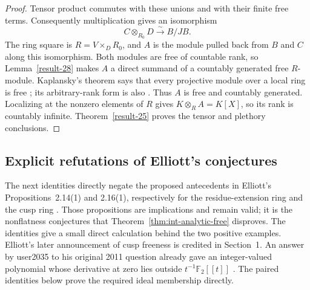 \documentclass[11pt,a4paper]{article}
\theoremstyle{definition}
\begin{document}
\begin{proof}
Tensor product commutes with these unions and with their finite
free terms. Consequently multiplication gives an isomorphism
\[
 C\otimes_{R_0}D\xrightarrow{\sim}B/JB.
\]
The ring square is $R=V\times_D R_0$, and $A$ is the module
pulled back from $B$ and $C$ along this isomorphism. Both modules
are free of countable rank, so Lemma~\ref{result-28} makes $A$
a direct summand of a countably generated free $R$-module.
Kaplansky's theorem says that every projective module over a local
ring is free \cite[Theorem~2]{Kaplansky1958}; its arbitrary-rank
form is also \cite[Theorem~10.85.4, tag 0593]{StacksProjectiveLocal}.
Thus $A$ is free and countably generated. Localizing at the
nonzero elements of $R$ gives $K\otimes_R A=K[X]$, so its
rank is countably infinite. Theorem~\ref{result-25} proves the
tensor and plethory conclusions.
\end{proof}



\subsection{Explicit refutations of Elliott's conjectures}
The next identities directly negate the proposed antecedents in
Elliott's Propositions~2.14(1) and 2.16(1), respectively for the
residue-extension ring and the cusp ring
\cite[author version p.~12]{Elliott2011IntegerTClosure}.
Those propositions are implications and remain valid; it is the
nonflatness conjectures that Theorem~\ref{thm:int-analytic-free}
disproves. The identities give a small direct calculation behind
the two positive examples. Elliott's later announcement of cusp
freeness is credited in Section~1. An answer by user2035 to his
original 2011 question already gave an integer-valued polynomial
whose derivative at zero lies outside $t^{-1}\mathbb F_2[[t]]$
\cite[answer of 12 September 2011]{Elliott2013CuspAnnouncement}.
The paired identities below prove the required ideal membership
directly.


\end{document}
